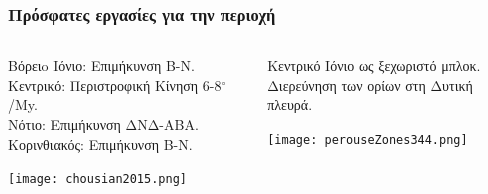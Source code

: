 
\graphicspath{{Chapter2/Figs/Vector/}{Chapter2/Figs/Raster/}{Chapter3/Figs/Vector/}{Chapter4/Figs/Vector/}{Chapter5/Figs/Vector/}{Chapter6/Figs/Vector1/}{Chapter7/Figs/Vector/}{Chapter8/Figs/Vector/}}


\begin{frame}
  \frametitle{Πρόσφατες εργασίες για την περιοχή}
  \label{fr2:previousIonio}
\begin{columns}
  \begin{column}{.49\textwidth}
  \begin{block}{\textcite{Chousianitis2015}}
  \begin{footnotesize}
    Βόρειo Ιόνιο: Επιμήκυνση Β-Ν.\\
    Κεντρικό: Περιστροφική Κίνηση 6-8$^{\circ}$/My.\\
    Νότιο: Επιμήκυνση ΔΝΔ-ΑΒΑ.\\
    Κορινθιακός: Επιμήκυνση Β-Ν.
  \end{footnotesize}
  \end{block}
  \centering
    \texttt{[image: chousian2015.png]}
  \end{column}
  \begin{column}{.49\textwidth}
  \begin{block}{\textcite{Perouse2013}}
\begin{footnotesize}
  Κεντρικό Ιόνιο ως ξεχωριστό μπλοκ.\\
  Διερεύνηση των ορίων στη Δυτική πλευρά.
  \end{footnotesize}
  \end{block}
  \centering
    \texttt{[image: perouseZones344.png]}
  \end{column}
\end{columns}

\end{frame}
\note{}


